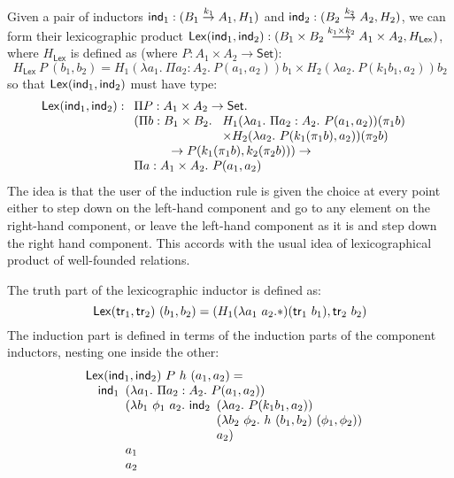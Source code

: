 \documentclass{article}
\newcommand{\Set}{\mathsf{Set}}
\begin{document}
Given a pair of inductors $\mathsf{ind}_1 : (B_1 \stackrel{k_1}\to A_1, H_1)$
and $\mathsf{ind}_2 : (B_2 \stackrel{k_2}\to A_2, H_2)$, we can form their
lexicographic product $\mathsf{Lex}(\mathsf{ind}_1, \mathsf{ind}_2) : (B_1 \times B_2
\stackrel{k_1 \times k_2}\longrightarrow A_1 \times A_2,
H_{\mathsf{Lex}})$, where $H_{\mathsf{Lex}}$ is defined as (where $P :
A_1 \times A_2 \to \Set$):
\begin{displaymath}
  H_{\mathsf{Lex}}\ P\ (b_1, b_2) = H_1(\lambda a_1.\ \Pi a_2 : A_2.\ P(a_1, a_2))b_1 \times H_2(\lambda a_2.\ P(k_1 b_1, a_2))b_2
\end{displaymath}
so that $\mathsf{Lex}(\mathsf{ind}_1, \mathsf{ind}_2)$ must have type:
\begin{displaymath}
  \mathsf{Lex}(\ind_1, \ind_2) : 
  \begin{array}[t]{l}
    \Pi P : A_1 \times A_2 \to \Set. \\
    (\Pi b : B_1 \times B_2.\
    \begin{array}[t]{l}
      H_1(\lambda a_1.\ \Pi a_2 : A_2.\ P(a_1, a_2))(\pi_1 b) \\
      \times H_2(\lambda a_2.\ P(k_1(\pi_1 b), a_2))(\pi_2 b)
    \end{array} \\
    \quad\quad\quad\to P (k_1 (\pi_1 b), k_2 (\pi_2 b))) \to \\
    \Pi a : A_1 \times A_2.\ P (a_1, a_2)
  \end{array}
\end{displaymath}
The idea is that the user of the induction rule is given the choice at
every point either to step down on the left-hand component and go to
any element on the right-hand component, or leave the left-hand
component as it is and step down the right hand component. This
accords with the usual idea of lexicographical product of well-founded
relations.

The truth part of the lexicographic inductor is defined as:
\begin{displaymath}
  \mathsf{Lex}(\mathsf{tr}_1, \mathsf{tr}_2)\ (b_1, b_2) = (H_1(\lambda a_1\ a_2. *)(\mathsf{tr}_1\ b_1) , \mathsf{tr}_2\ b_2)
\end{displaymath}
The induction part is defined in terms of the induction parts of the
component inductors, nesting one inside the other:
\begin{displaymath}
  \begin{array}[t]{l}
    \mathsf{Lex}(\mathsf{ind}_1,\mathsf{ind}_2)\ P\ h\ (a_1,a_2) = \\
    \quad \mathsf{ind}_1
    \begin{array}[t]{l}
      (\lambda a_1.\ \Pi a_2 : A_2.\ P(a_1,a_2)) \\
      (\lambda b_1\ \phi_1\ a_2.\ \mathsf{ind}_2
      \begin{array}[t]{l}
        (\lambda a_2.\ P(k_1 b_1, a_2)) \\
        (\lambda b_2\ \phi_2.\ h\ (b_1, b_2)\ (\phi_1, \phi_2)) \\
        a_2)
      \end{array} \\
      a_1 \\
      a_2
    \end{array}
  \end{array}
\end{displaymath}
\end{document}
